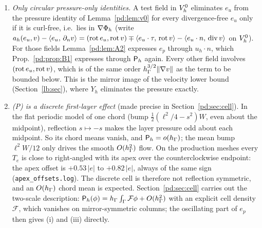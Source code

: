 \begin{remark}\label{pd:rem:obstr}
\begin{enumerate}
\item \emph{Only circular pressure-only identities.} A test field in $V_h^0$ eliminates $e_u$ from the pressure identity of Lemma~\ref{pd:lem:v0} for every divergence-free $e_u$ only if it is curl-free, i.e.\ lies in $\nabla\Phi_h$ (write $a_h(e_u,v)-\langle e_u,\, \partial_n v\rangle=(\operatorname{rot} e_u,\operatorname{rot} v)\mp\langle e_u\cdot\tau,\, \operatorname{rot} v\rangle-\langle e_u\cdot n,\, \operatorname{div} v\rangle$ on $V_h^0$). For those fields Lemma~\ref{pd:lem:A2} expresses $e_p$ through $u_h\cdot n$, which Prop.~\ref{pd:prop:B1} expresses through $\mathsf P_h$ again. Every other field involves $(\operatorname{rot} e_u,\operatorname{rot} v)$, which is of the same order $h_\Gamma^{3/2}\lVert \nabla v\rVert$ as the term to be bounded below. This is the mirror image of the velocity lower bound (Section~\ref{lb:sec}), where $Y_h$ eliminates the pressure exactly.
\item \emph{(P) is a discrete first-layer effect} (made precise in Section~\ref{pd:sec:cell}). In the flat periodic model of one chord (bump $\frac12(\ell^2/4-s^2)W$, even about the midpoint), reflection $s\mapsto-s$ makes the layer pressure odd about each midpoint. So its chord means vanish, and $\mathsf P_h=o(h_\Gamma)$; the mean bump $\ell^2W/12$ only drives the smooth $O(h_\Gamma^2)$ flow. On the production meshes every $T_e$ is close to right-angled with its apex over the counterclockwise endpoint: the apex offset is $+0.53\,|e|$ to $+0.82\,|e|$, always of the same sign (\texttt{apex\_offsets.log}). The discrete cell is therefore not reflection symmetric, and an $O(h_\Gamma)$ chord mean is expected. Section~\ref{pd:sec:cell} carries out the two-scale description: $\mathsf P_h(\phi)=h_\Gamma\int_\Gamma\mathcal F\phi+O(h_\Gamma^2)$ with an explicit cell density $\mathcal F$, which vanishes on mirror-symmetric columns; the oscillating part of $e_p$ then gives (i) and (iii) directly.
\end{enumerate}
\end{remark}

